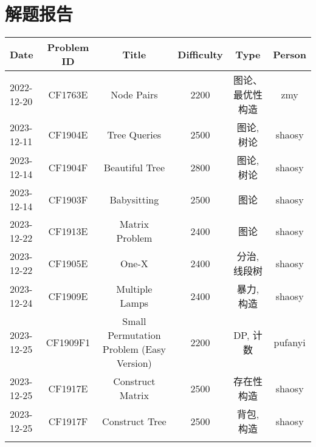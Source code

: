 \chapter{解题报告}
\begin{center}
\begin{longtable}{l c c c c c }

Date & Problem ID & Title & Difficulty & Type & Person   \\ 
\hline
2022-12-20 & CF1763E & Node Pairs & 2200 & 图论、最优性构造 & zmy  \\
2023-12-11 & CF1904E & Tree Queries & 2500 & 图论, 树论 & shaosy \\
2023-12-14 & CF1904F & Beautiful Tree & 2800 & 图论, 树论 & shaosy \\
2023-12-14 & CF1903F & Babysitting & 2500 & 图论 & shaosy \\
2023-12-22 & CF1913E & Matrix Problem & 2400 & 图论 & shaosy \\
2023-12-22 & CF1905E & One-X & 2400 & 分治, 线段树 & shaosy \\
2023-12-24 & CF1909E & Multiple Lamps & 2400 & 暴力, 构造 & shaosy \\
2023-12-25 & CF1909F1 & Small Permutation Problem (Easy Version) & 2200 & DP, 计数 & pufanyi \\
2023-12-25 & CF1917E & Construct Matrix & 2500 & 存在性构造 & shaosy \\
2023-12-25 & CF1917F & Construct Tree & 2500 & 背包, 构造 & shaosy \\
\hline

\label{tab:practice_index}
\end{longtable}
\end{center}


